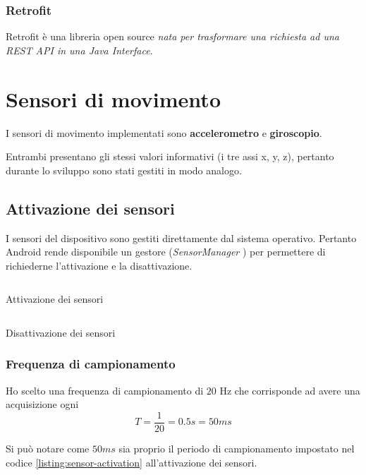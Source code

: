 \subsubsection{Retrofit}
Retrofit \cite{retrofit} è una libreria open source \textit{nata per trasformare una richiesta ad una REST API 
in una Java Interface}.


\newpage
\section{Sensori di movimento}
I sensori di movimento implementati sono \textbf{accelerometro} e \textbf{giroscopio}.

Entrambi presentano gli stessi valori informativi (i tre assi x, y, z), pertanto durante lo sviluppo sono stati gestiti in modo analogo.

\subsection{Attivazione dei sensori}
I sensori del dispositivo sono gestiti direttamente dal sistema operativo. Pertanto Android rende disponibile 
un gestore (\textit{SensorManager} \cite{sensor_manager}) per permettere di richiederne l'attivazione e la disattivazione.

\begin{listing}[H] 
    \inputminted[frame=single,framesep=10pt]{java}{assets/snippets/app/sensors/start_sensors.java}
    \caption{Attivazione dei sensori}
    \label{listing:sensor-activation}
\end{listing}
\begin{listing}[H] 
    \inputminted[frame=single,framesep=10pt]{java}{assets/snippets/app/sensors/stop_sensors.java}
    \caption{Disattivazione dei sensori}
    \label{listing:sensor-deactivation}
\end{listing}

\subsubsection{Frequenza di campionamento}
Ho scelto una frequenza di campionamento di $20$ Hz che corrisponde ad avere una acquisizione 
ogni 
$$T = \frac{1}{20} = 0.5 s = 50ms $$

\vspace{5mm} %
\noindent Si può notare come $50ms$ sia proprio il periodo di campionamento impostato 
nel codice \ref{listing:sensor-activation} all'attivazione dei sensori.


